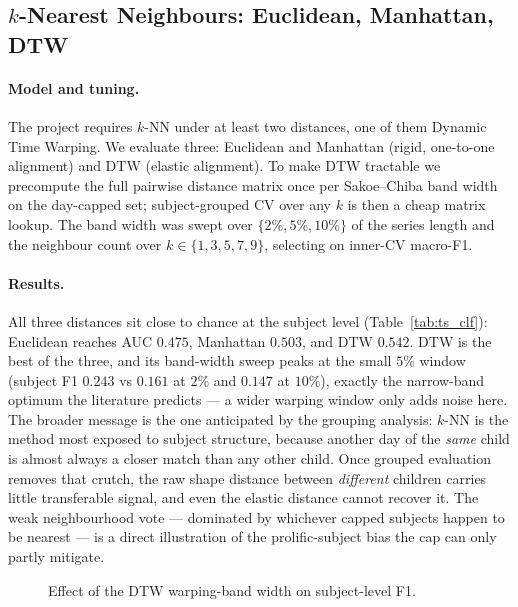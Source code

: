 \subsection{$k$-Nearest Neighbours: Euclidean, Manhattan, DTW}
\paragraph{Model and tuning.} The project requires $k$-NN under at least two distances, one of them Dynamic Time Warping. We evaluate three: Euclidean and Manhattan (rigid, one-to-one alignment) and DTW (elastic alignment). To make DTW tractable we precompute the full pairwise distance matrix once per Sakoe--Chiba band width on the day-capped set; subject-grouped CV over any $k$ is then a cheap matrix lookup. The band width was swept over $\{2\%, 5\%, 10\%\}$ of the series length and the neighbour count over $k\in\{1,3,5,7,9\}$, selecting on inner-CV macro-F1.

\paragraph{Results.} All three distances sit close to chance at the subject level (Table~\ref{tab:ts_clf}): Euclidean reaches AUC $0.475$, Manhattan $0.503$, and DTW $0.542$. DTW is the best of the three, and its band-width sweep peaks at the small $5\%$ window (subject F1 $0.243$ vs $0.161$ at $2\%$ and $0.147$ at $10\%$), exactly the narrow-band optimum the literature predicts --- a wider warping window only adds noise here. The broader message is the one anticipated by the grouping analysis: $k$-NN is the method most exposed to subject structure, because another day of the \emph{same} child is almost always a closer match than any other child. Once grouped evaluation removes that crutch, the raw shape distance between \emph{different} children carries little transferable signal, and even the elastic distance cannot recover it. The weak neighbourhood vote --- dominated by whichever capped subjects happen to be nearest --- is a direct illustration of the prolific-subject bias the cap can only partly mitigate.

\begin{figure}[h]
    \centering
    \caption{Effect of the DTW warping-band width on subject-level F1.}
    \label{fig:ts_dtw}
\end{figure}


